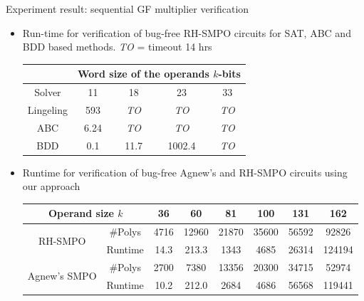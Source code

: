 \documentclass[xcolor=dvipsnames]{beamer}
\newcommand{\bi}{\begin{itemize}}
\newcommand{\ei}{\end{itemize}}
\begin{document}
\begin{frame}{\large{Experiment result: sequential GF multiplier verification}}
\bi
\item Run-time for verification of bug-free RH-SMPO circuits
  for SAT, ABC and BDD based methods. \emph{TO} = timeout 14 hrs
\begin{table}[H]
\centering
\label{tbl:equiv}
\begin{tabular}{|c||c|c|c|c|} 
\hline
& \multicolumn{4}{|c|}{Word size of the operands $k$-bits}  \\
\hline
Solver & 11 & 18 & 23 & 33 \\
\hline
\hline
Lingeling & 593  & \emph{TO}  & \emph{TO}  & \emph{TO}\\
\hline
\hline
ABC & 6.24 & \emph{TO} & \emph{TO} & \emph{TO}\\
\hline
\hline
BDD & 0.1 & 11.7 & 1002.4 & \emph{TO}  \\
\hline
\end{tabular}
\label{table:satbdd}  
\end{table} 
\item Runtime for verification of bug-free Agnew's and RH-SMPO circuits using our approach
\hspace{-0.3in}\begin{table}[H]
\centering
\label{tab:Cpp}
{\small 
\begin{tabular}{|c|c||c|c|c|c|c|c|}
\hline
\multicolumn{2}{|c||}{\centering Operand size $k$} & 36 & 60 & 81 & 100 & 131 & 162 \\
\hline
\multirow{2}{1cm}{\centering RH-SMPO} & \#Polys & 4716 & 12960 & 21870 & 35600 & 56592 & 92826 \\
\cline{2-8}
 & Runtime & 14.3 & 213.3 & 1343 & 4685 & 26314 & 124194 \\
\hline
\multirow{2}{1cm}{\centering Agnew's SMPO} & \#Polys & 2700 & 7380 & 13356 & 20300 & 34715 & 52974 \\
\cline{2-8}
 & Runtime & 10.2 & 212.0 & 2684 & 4686 & 56568 & 119441 \\
 
 \hline

\end{tabular}
}
\end{table}
\ei
\end{frame}
\end{document}
